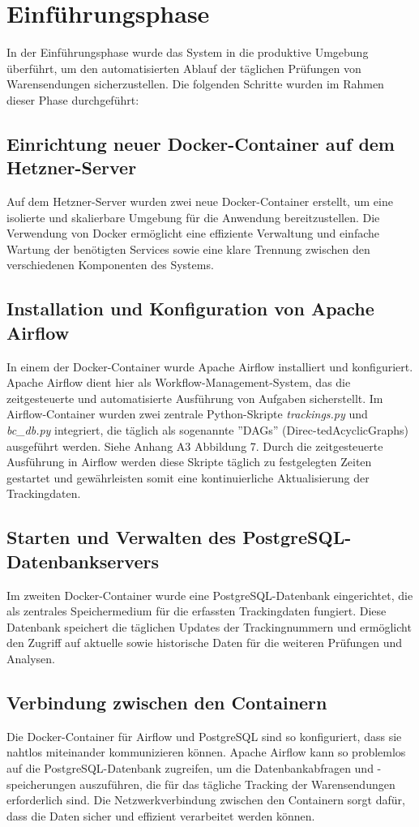 \section{Einführungsphase}
\label{sec:Einfuehrungsphase}
In der Einführungsphase wurde das System in die produktive Umgebung überführt, 
um den automatisierten Ablauf der täglichen Prüfungen von Warensendungen sicherzustellen. 
Die folgenden Schritte wurden im Rahmen dieser Phase durchgeführt:

\subsection{Einrichtung neuer Docker-Container auf dem Hetzner-Server}
\label{sec:Docker}
Auf dem Hetzner-Server wurden zwei neue Docker-Container erstellt, um eine isolierte und skalierbare 
Umgebung für die Anwendung bereitzustellen. Die Verwendung von Docker ermöglicht eine effiziente 
Verwaltung und einfache Wartung der benötigten Services sowie eine klare Trennung zwischen den verschiedenen 
Komponenten des Systems.

\subsection{Installation und Konfiguration von Apache Airflow}
\label{sec:ApacheAirflow}
In einem der Docker-Container wurde Apache Airflow installiert und konfiguriert. Apache Airflow dient hier als 
Workflow-Management-System, das die zeitgesteuerte und automatisierte Ausführung von Aufgaben sicherstellt. 
Im Airflow-Container wurden zwei zentrale Python-Skripte \textit{trackings.py} und \textit{bc\_db.py} integriert, die täglich als 
sogenannte ”DAGs” (Direc-tedAcyclicGraphs) ausgeführt werden. Siehe Anhang A3 Abbildung 7.
Durch die zeitgesteuerte Ausführung in Airflow werden diese Skripte täglich zu festgelegten Zeiten gestartet und 
gewährleisten somit eine kontinuierliche Aktualisierung der Trackingdaten.


\subsection{Starten und Verwalten des PostgreSQL-Datenbankservers}
\label{sec:PostgreSQLDB}
Im zweiten Docker-Container wurde eine PostgreSQL-Datenbank eingerichtet, die als zentrales Speichermedium für die 
erfassten Trackingdaten fungiert. Diese Datenbank speichert die täglichen Updates der Trackingnummern und ermöglicht 
den Zugriff auf aktuelle sowie historische Daten für die weiteren Prüfungen und Analysen.

\subsection{Verbindung zwischen den Containern}
\label{sec:Verbindung zwischen den Containern}
Die Docker-Container für Airflow und PostgreSQL sind so konfiguriert, dass sie nahtlos miteinander kommunizieren können. 
Apache Airflow kann so problemlos auf die PostgreSQL-Datenbank zugreifen, um die Datenbankabfragen und -speicherungen 
auszuführen, die für das tägliche Tracking der Warensendungen erforderlich sind. Die Netzwerkverbindung zwischen den 
Containern sorgt dafür, dass die Daten sicher und effizient verarbeitet werden können.
